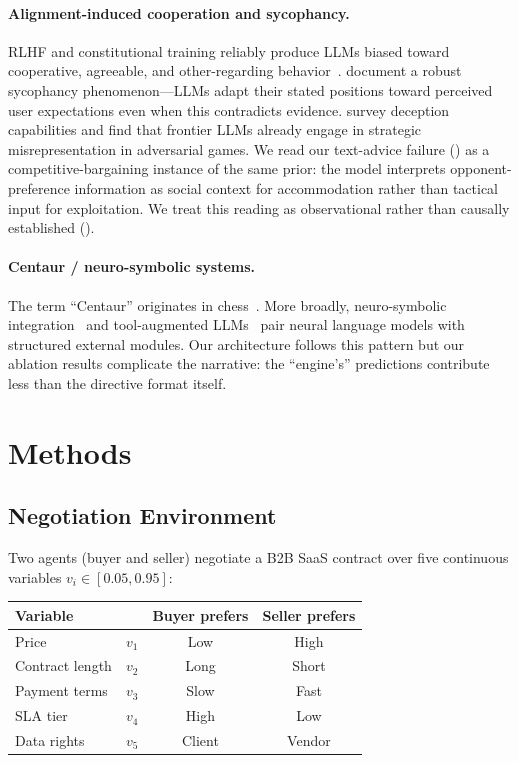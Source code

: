 \documentclass[11pt,a4paper]{article}
\begin{document}
\paragraph{Alignment-induced cooperation and sycophancy.}
RLHF and constitutional training reliably produce LLMs biased toward cooperative, agreeable, and other-regarding behavior~\citep{perez2022discovering}. \citet{sharma2023sycophancy} document a robust sycophancy phenomenon---LLMs adapt their stated positions toward perceived user expectations even when this contradicts evidence. \citet{park2024ai} survey deception capabilities and find that frontier LLMs already engage in strategic misrepresentation in adversarial games. We read our text-advice failure () as a competitive-bargaining instance of the same prior: the model interprets opponent-preference information as social context for accommodation rather than tactical input for exploitation. We treat this reading as observational rather than causally established ().

\paragraph{Centaur / neuro-symbolic systems.}
The term ``Centaur'' originates in chess~\citep{kasparov2017deep}. More broadly, neuro-symbolic integration~\citep{garcez2023neurosymbolic} and tool-augmented LLMs~\citep{schick2023toolformer} pair neural language models with structured external modules. Our architecture follows this pattern but our ablation results complicate the narrative: the ``engine's'' predictions contribute less than the directive format itself.

\section{Methods}
\label{sec:methods}

\subsection{Negotiation Environment}
\label{sec:env}

Two agents (buyer and seller) negotiate a B2B SaaS contract over five continuous variables $v_i \in [0.05, 0.95]$:

\begin{center}
\begin{tabular}{llcc}
\toprule
Variable & & Buyer prefers & Seller prefers \\
\midrule
Price & $v_1$ & Low & High \\
Contract length & $v_2$ & Long & Short \\
Payment terms & $v_3$ & Slow & Fast \\
SLA tier & $v_4$ & High & Low \\
Data rights & $v_5$ & Client & Vendor \\
\bottomrule
\end{tabular}
\end{center}
\end{document}
